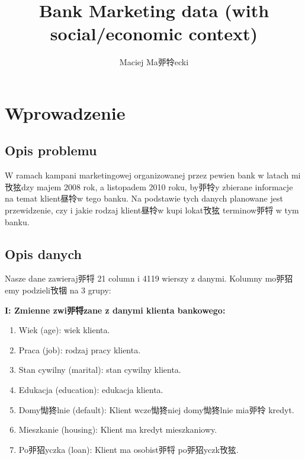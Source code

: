 \documentclass[11pt]{article}\usepackage[]{graphicx}\usepackage[]{color}
\begin{document}
\title{Bank Marketing data (with social/economic context)}
\author{Maciej Ma戼㸳ecki}
\maketitle
{}
\tableofcontents

\newpage

\section{Wprowadzenie}
\subsection{Opis problemu}
W ramach kampani marketingowej organizowanej przez pewien bank w latach mi攼㹡dzy majem 2008 rok, a listopadem 2010 roku, by戼㸳y zbierane informacje na temat klient昼㸳w tego banku. 
Na podstawie tych danych planowane jest przewidzenie, czy i jakie rodzaj klient昼㸳w kupi lokat攼㹡 terminow戼㸹 w tym banku.

\subsection{Opis danych}
Nasze dane zawieraj戼㸹 21 column i 4119 wierszy z danymi. Kolumny mo戼㹦emy podzieli攼㸶 na 3 grupy:

\textbf{I: Zmienne zwi戼㸹zane z danymi klienta bankowego:}

\begin{enumerate}
\item Wiek (age): wiek klienta.
\item Praca (job): rodzaj pracy klienta.
\item Stan cywilny (marital): stan cywilny klienta.
\item Edukacja (education): edukacja klienta.
\item Domy㤼㹣lnie (default): Klient wcze㤼㹣niej domy㤼㹣lnie mia戼㸳 kredyt.
\item Mieszkanie (housing): Klient ma kredyt mieszkaniowy.
\item Po戼㹦yczka (loan): Klient ma osobist戼㸹 po戼㹦yczk攼㹡.
\end{enumerate}
\end{document}
